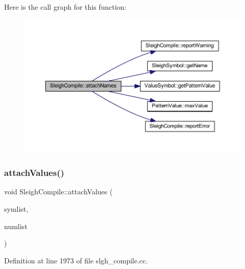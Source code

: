 Here is the call graph for this function\+:
\nopagebreak
\begin{figure}[H]
\begin{center}
\leavevmode
\includegraphics[width=350pt]{class_sleigh_compile_aeb453f70cf88dfa1459a859c5d3ef551_cgraph}
\end{center}
\end{figure}
\mbox{\label{class_sleigh_compile_aaa65f4c8bab6da49b695e36808ee6724}} 
\subsubsection{\texorpdfstring{attachValues()}{attachValues()}}
{\footnotesize\ttfamily void Sleigh\+Compile\+::attach\+Values (\begin{DoxyParamCaption}\item[{vector$<$ \mbox{\hyperlink{class_sleigh_symbol}{Sleigh\+Symbol}} $\ast$ $>$ $\ast$}]{symlist,  }\item[{vector$<$ \mbox{\hyperlink{types_8h_aa925ba3e627c2df89d5b1cfe84fb8572}{intb}} $>$ $\ast$}]{numlist }\end{DoxyParamCaption})}



Definition at line 1973 of file slgh\+\_\+compile.\+cc.

